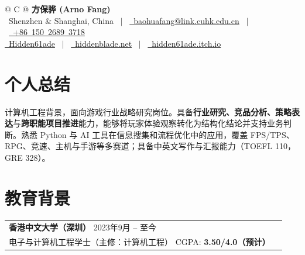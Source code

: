 \documentclass[a4paper,12pt]{article}
\begin{document}
\pagestyle{empty}

\begin{tabularx}{\linewidth}{@{} C @{} }
{\Huge \textbf{方保骅 (Arno Fang)}} \\[7.5pt]
{\faMapMarker\ Shenzhen \& Shanghai, China} \ $|$ \
\href{mailto:baohuafang@link.cuhk.edu.cn}{\raisebox{-0.05\height}\faEnvelope\ baohuafang@link.cuhk.edu.cn} \ $|$ \
\href{tel:+8615026893718}{\raisebox{-0.05\height}\faMobile\ +86\ 150\ 2689\ 3718} \\
\href{https://github.com/Hidden61ade}{\raisebox{-0.05\height}\faGithub\ Hidden61ade} \ $|$ \
\href{https://hiddenblade.net}{\raisebox{-0.05\height}\faGlobe\ hiddenblade.net} \ $|$ \
\href{https://hidden61ade.itch.io/}{\raisebox{-0.05\height}\faGlobe\ hidden61ade.itch.io}
\end{tabularx}

\section{个人总结}
计算机工程背景，面向游戏行业战略研究岗位。具备\textbf{行业研究、竞品分析、策略表达}与\textbf{跨职能项目推进}能力，能够将玩家体验观察转化为结构化结论并支持业务判断。熟悉 Python 与 AI 工具在信息搜集和流程优化中的应用，覆盖 FPS/TPS、RPG、竞速、主机与手游等多赛道；具备中英文写作与汇报能力（TOEFL 110，GRE 328）。

\section{教育背景}
\begin{tabularx}{\linewidth}{@{}l X@{}}
\textbf{香港中文大学（深圳）} \hfill 2023年9月 -- 至今 \\
电子与计算机工程学士（主修：计算机工程） \hfill \normalsize CGPA: \textbf{3.50/4.0（预计）} \\
\end{tabularx}

\end{document}
